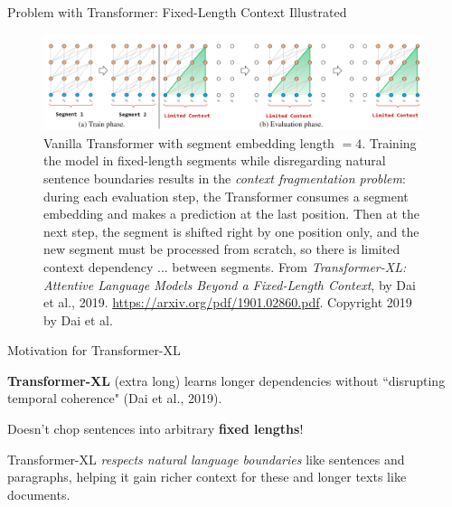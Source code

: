     
\begin{frame}{Problem with Transformer: Fixed-Length Context Illustrated}
    

    \begin{figure}[h]
    \vspace{-5pt}
    \centering
    \includegraphics[width=0.99\textwidth]{imgs/transXL_vanillaSegmentation.png}
    \caption{Vanilla Transformer with segment embedding length $ = 4$. Training the model in fixed-length segments while disregarding natural sentence boundaries results in the \emph{context fragmentation problem}: during each evaluation step, the Transformer consumes a segment embedding and makes a prediction at the last position. Then {\color{Teal} at the next step, the segment is shifted right by one position only, and the new segment must be processed from scratch, so there is limited context dependency ... between segments.} From \emph{Transformer-XL: Attentive Language Models Beyond a Fixed-Length Context}, by Dai et al., 2019. \url{https://arxiv.org/pdf/1901.02860.pdf}. Copyright 2019 by Dai et al.}
    \vspace{-5pt}
    \label{fig:transXL_VanillaSegment}
    \end{figure}
    
\end{frame}



\begin{frame}{\large Motivation for Transformer-XL}

    \begin{itemizeSpaced}{15pt}
    \small 
    
        \item \textbf{Transformer-XL} (extra long) learns longer dependencies without ``disrupting temporal coherence"  (Dai et al., 2019). 
        
        \item Doesn't chop sentences into arbitrary \textbf{fixed lengths}!
        
        \pinkbox Transformer-XL \emph{respects natural language boundaries} like sentences and paragraphs, helping it gain richer context for these and longer texts like documents. 
        
    \end{itemizeSpaced}
    
\end{frame}


